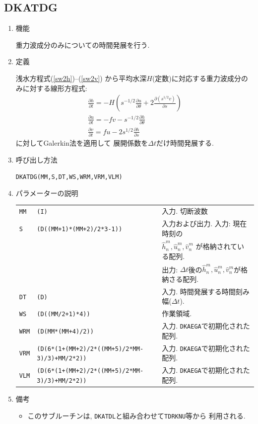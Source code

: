 \documentclass[a4j,fleqn]{jarticle}
\begin{document}

\subsection{DKATDG}

\begin{enumerate}

\item 機能

重力波成分のみについての時間発展を行う.

\item 定義

浅水方程式(\ref{sw2h})--(\ref{sw2v})
から平均水深$H$(定数)に対応する重力波成分のみに対する線形方程式:
\begin{gather}
\frac{\partial h}{\partial t}
= 
-H\left(s^{-1/2}\frac{\partial u}{\partial\theta}
   +2\frac{\partial( s^{1/2}v)}{\partial s}\right)
   \\
\frac{\partial u}{\partial t}
= -fv
   -s^{-1/2}\frac{\partial h}{\partial\theta}
   \\
\frac{\partial v}{\partial t}
= fu-2s^{1/2}\frac{\partial h}{\partial s}
\end{gather}
に対してGalerkin法を適用して
展開係数を$\Delta t$だけ時間発展する.

\item 呼び出し方法 
    
{\tt DKATDG(MM,S,DT,WS,WRM,VRM,VLM)}
  
\item パラメーターの説明 
    
\begin{tabular}{lll}
{\tt MM} & {\tt (I)} & 入力. 切断波数\\
{\tt S}   & {\tt (D((MM+1)*(MM+2)/2*3-1))} & 入力および出力. 入力: 現在時刻の\\
  & & $\hat h^m_n,\hat u^m_n,\hat v^m_n$ が格納されている配列.\\
  & & 出力: $\Delta t$後の$\hat h^m_n,\hat u^m_n,\hat v^m_n$が格納さる配列.\\
{\tt DT}   & {\tt (D)} & 入力. 時間発展する時間刻み幅($\Delta t$).\\
{\tt WS}   & {\tt (D((MM/2+1)*4))} & 作業領域.\\
{\tt WRM}  & {\tt (D(MM*(MM+4)/2))} & 入力. {\tt DKAEGA}で初期化された配列.\\
{\tt VRM}  & {\tt (D(6*(1+(MM+2)/2*((MM+5)/2*MM-3)/3)+MM/2*2))} & 入力. {\tt DKAEGA}で初期化された配列.\\
{\tt VLM}  & {\tt (D(6*(1+(MM+2)/2*((MM+5)/2*MM-3)/3)+MM/2*2))} & 入力. {\tt DKAEGA}で初期化された配列.
\end{tabular}

\item 備考

\begin{itemize}

\item このサブルーチンは, {\tt DKATDL}と組み合わせて{\tt TDRKNU}等から
利用される.

\end{itemize}

\end{enumerate}
\end{document}
